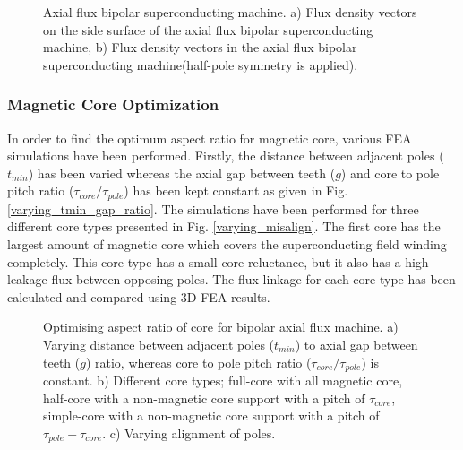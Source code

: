 \documentclass[final,peerreview,onecolumn]{IEEEtran}
\begin{document}
\begin{figure}[!h]
\centerline{
\hfil
{}
}
\caption{Axial flux bipolar superconducting machine. a) Flux density vectors on the side surface of the axial flux bipolar superconducting machine, b) Flux density vectors in the axial flux bipolar superconducting machine(half-pole symmetry is applied). }
\end{figure}


\subsubsection{Magnetic Core Optimization}


In order to find the optimum aspect ratio for magnetic core, various FEA simulations have been performed. Firstly, the distance between adjacent poles ($t_{min}$) has been varied whereas the axial gap between teeth ($g$) and core to pole pitch ratio ($\tau_{core}/\tau_{pole}$) has been kept constant as given in Fig. \ref{varying_tmin_gap_ratio}.  The simulations have been performed for three different core types presented in Fig. \ref{varying_misalign}. The first core has the largest amount of magnetic core which covers the superconducting field winding completely. This core type has a small core reluctance, but it also has a high leakage flux between opposing poles. The flux linkage for each core type has been calculated and compared using 3D FEA results.

\begin{figure}[!h]
\centerline{
\hfil
\hfil
}
\caption{Optimising aspect ratio of core for bipolar axial flux machine. a) Varying distance between adjacent poles ($t_{min}$) to axial gap between teeth ($g$) ratio, whereas core to pole pitch ratio ($\tau_{core}/\tau_{pole}$) is constant.
b) Different core types; full-core with all magnetic core, half-core with a non-magnetic core support with a pitch of $\tau_{core}$, simple-core with a non-magnetic core support with a pitch of $\tau_{pole}-\tau_{core}$.
c) Varying alignment of poles.}
\end{figure}
\end{document}
